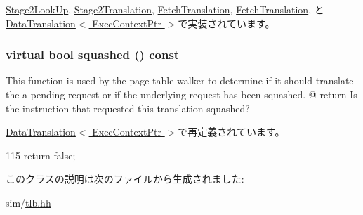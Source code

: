 \hyperlink{classArmISA_1_1Stage2LookUp_ad1fd11d1e352cfc4b329d29b46a19fc4}{Stage2LookUp}, \hyperlink{classArmISA_1_1Stage2MMU_1_1Stage2Translation_ad1fd11d1e352cfc4b329d29b46a19fc4}{Stage2Translation}, \hyperlink{classDefaultFetch_1_1FetchTranslation_ad1fd11d1e352cfc4b329d29b46a19fc4}{FetchTranslation}, \hyperlink{classTimingSimpleCPU_1_1FetchTranslation_ad1fd11d1e352cfc4b329d29b46a19fc4}{FetchTranslation}, と \hyperlink{classDataTranslation_ad1fd11d1e352cfc4b329d29b46a19fc4}{DataTranslation$<$ ExecContextPtr $>$}で実装されています。\hypertarget{classBaseTLB_1_1Translation_a1c71e1db7a83ffde808111e2b1cec6c6}{
\subsubsection[{squashed}]{\setlength{\rightskip}{0pt plus 5cm}virtual bool squashed () const}}
\label{classBaseTLB_1_1Translation_a1c71e1db7a83ffde808111e2b1cec6c6}
This function is used by the page table walker to determine if it should translate the a pending request or if the underlying request has been squashed. @ return Is the instruction that requested this translation squashed? 

\hyperlink{classDataTranslation_af355b62f22559090d6e3047bdf83f24f}{DataTranslation$<$ ExecContextPtr $>$}で再定義されています。


\begin{DoxyCode}
115 { return false; }
\end{DoxyCode}


このクラスの説明は次のファイルから生成されました:\begin{DoxyCompactItemize}
\item 
sim/\hyperlink{sim_2tlb_8hh}{tlb.hh}\end{DoxyCompactItemize}
